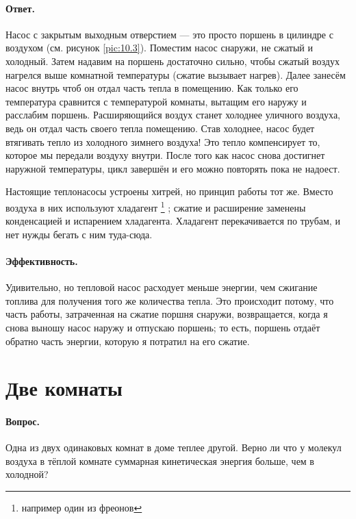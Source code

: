 \paragraph{Ответ.}
Насос с закрытым выходным отверстием — это просто поршень в цилиндре с воздухом (см. рисунок \ref{pic:10.3}).
Поместим насос снаружи, не сжатый и холодный.
Затем надавим на поршень достаточно сильно, чтобы сжатый воздух нагрелся выше комнатной температуры (сжатие вызывает нагрев).
Далее занесём насос внутрь чтоб он отдал часть тепла в помещению.
Как только его температура сравнится с температурой комнаты, вытащим его наружу и расслабим поршень.
Расширяющийся воздух станет холоднее уличного воздуха, ведь он отдал часть своего тепла помещению.
Став холоднее, насос будет втягивать тепло из холодного зимнего воздуха!
Это тепло компенсирует то, которое мы передали воздуху внутри.
После того как насос снова достигнет наружной температуры, цикл завершён и его можно повторять пока не надоест.

Настоящие теплонасосы устроены хитрей, но принцип работы тот же.
Вместо воздуха в них используют хладагент%
\footnote{например один из фреонов \pr}%
; сжатие и расширение заменены конденсацией и испарением хладагента.
Хладагент перекачивается по трубам, и нет нужды бегать с ним туда-сюда.

\paragraph{Эффективность.}
Удивительно, но тепловой насос расходует меньше энергии, чем сжигание топлива для получения того же количества тепла.
Это происходит потому, что часть работы, затраченная на сжатие поршня снаружи, возвращается, когда я снова выношу насос наружу и отпускаю поршень; то есть, поршень отдаёт обратно часть энергии, которую я потратил на его сжатие.

\section{Две комнаты}

\paragraph{Вопрос.}
Одна из двух одинаковых комнат в доме теплее другой.
Верно ли что у молекул воздуха в тёплой комнате
суммарная кинетическая энергия больше, чем в холодной?

